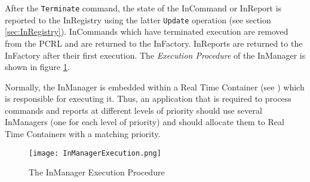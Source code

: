 After the \texttt{Terminate} command, the state of the InCommand or InReport is reported to the InRegistry using the latter \texttt{Update} operation (see section \ref{sec:InRegistry}). InCommands which have terminated execution are removed from the PCRL and are returned to the InFactory. InReports are returned to the InFactory after their first execution. The \textit{Execution Procedure} of the InManager is shown in figure \ref{fig:InManagerExecution}.

Normally, the InManager is embedded within a Real Time Container (see \cite{ref:fwprofile}) which is responsible for executing it. Thus, an application that is required to process commands and reports at different levels of priority should use several InManagers (one for each level of priority) and should allocate them to Real Time Containers with a matching priority.

\begin{figure}[H]
 \centering
 \texttt{[image: InManagerExecution.png]}
 \caption{The InManager Execution Procedure}
 \label{fig:InManagerExecution}
\end{figure}


